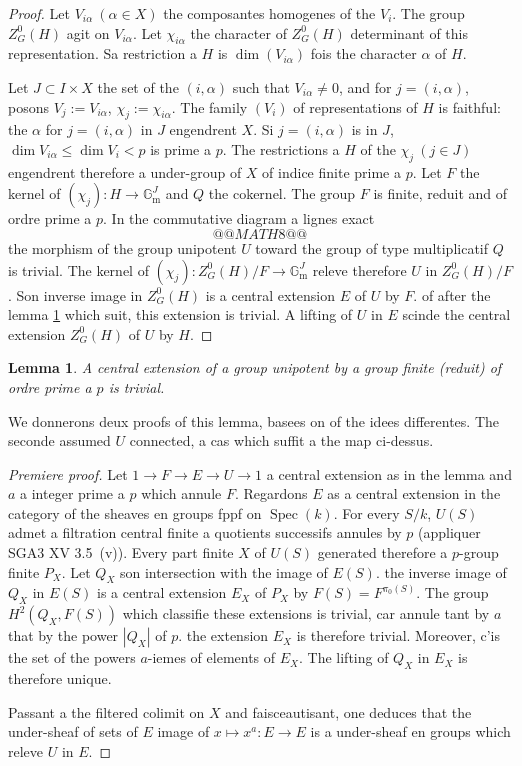 \documentclass[11pt,a4paper]{article}
\theoremstyle{plain}
\newtheorem{lemma}[theorem]{Lemma}
\theoremstyle{definition}
\DeclareMathOperator{\Spec}{Spec}
\newcommand{\Gm}{\mathbb{G}_\mathrm{m}}
\begin{document}
\begin{proof}
Let $V_{i\alpha}\ (\alpha \in X)$ the composantes homogenes of the $V_i$. The group $Z^0_G(H)$ agit on $V_{i\alpha}$. Let $\chi_{i\alpha}$ the character of $Z^0_G(H)$ determinant of this representation. Sa restriction a $H$ is $\dim(V_{i\alpha})$ fois the character $\alpha$ of $H$.

Let $J \subset I \times X$ the set of the $(i,\alpha)$ such that $V_{i\alpha} \neq 0$, and for $j = (i,\alpha)$, posons $V_j := V_{i\alpha}$, $\chi_j := \chi_{i\alpha}$. The family $(V_i)$ of representations of $H$ is faithful: the $\alpha$ for $j = (i,\alpha)$ in $J$ engendrent $X$. Si $j = (i,\alpha)$ is in $J$, $\dim V_{i\alpha} \leq \dim V_i < p$ is prime a $p$. The restrictions a $H$ of the $\chi_j\ (j \in J)$ engendrent therefore a under-group of $X$ of indice finite prime a $p$. Let $F$ the kernel of $(\chi_j): H \to \Gm^J$ and $Q$ the cokernel. The group $F$ is finite, reduit and of ordre prime a $p$. In the commutative diagram a lignes exact
\[
@@MATH8@@
\]
the morphism of the group unipotent $U$ toward the group of type multiplicatif $Q$ is trivial. The kernel of $(\chi_j): Z^0_G(H)/F \to \Gm^J$ releve therefore $U$ in $Z^0_G(H)/F$. Son inverse image in $Z^0_G(H)$ is a central extension $E$ of $U$ by $F$. of after the lemma \ref{lem:1.8} which suit, this extension is trivial. A lifting of $U$ in $E$ scinde the central extension $Z^0_G(H)$ of $U$ by $H$.
\end{proof}

\begin{lemma}\label{lem:1.8}
A central extension of a group unipotent by a group finite (reduit) of ordre prime a $p$ is trivial.
\end{lemma}

We donnerons deux proofs of this lemma, basees on of the idees differentes. The seconde assumed $U$ connected, a cas which suffit a the map ci-dessus.

\begin{proof}[Premiere proof]
Let $1 \to F \to E \to U \to 1$ a central extension as in the lemma and $a$ a integer prime a $p$ which annule $F$. Regardons $E$ as a central extension in the category of the sheaves en groups fppf on $\Spec(k)$. For every $S/k$, $U(S)$ admet a filtration central finite a quotients successifs annules by $p$ (appliquer SGA3 XV 3.5~(v)). Every part finite $X$ of $U(S)$ generated therefore a $p$-group finite $P_X$. Let $Q_X$ son intersection with the image of $E(S)$. the inverse image of $Q_X$ in $E(S)$ is a central extension $E_X$ of $P_X$ by $F(S) = F^{\pi_0(S)}$. The group $H^2(Q_X, F(S))$ which classifie these extensions is trivial, car annule tant by $a$ that by the power $|Q_X|$ of $p$. the extension $E_X$ is therefore trivial. Moreover, c'is the set of the powers $a$-iemes of elements of $E_X$. The lifting of $Q_X$ in $E_X$ is therefore unique.

Passant a the filtered colimit on $X$ and faisceautisant, one deduces that the under-sheaf of sets of $E$ image of $x \mapsto x^a: E \to E$ is a under-sheaf en groups which releve $U$ in $E$.
\end{proof}
\end{document}
